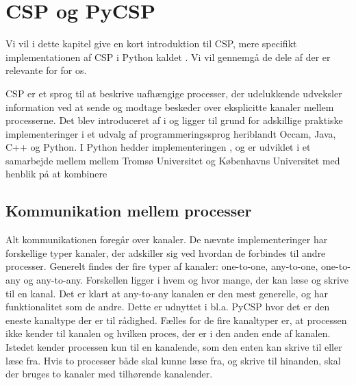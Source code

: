 \chapter{CSP og PyCSP}\label{sec:csp}


Vi vil i dette kapitel give en kort introduktion til CSP, mere specifikt implementationen af CSP i Python kaldet \pycsp. Vi vil gennemgå de dele af \pycsp der er relevante for for os. 

CSP er et sprog til at beskrive uafhængige processer, der udelukkende udveksler information ved at sende og modtage beskeder over eksplicitte kanaler mellem processerne. Det blev introduceret af \citeauthor{hoare-csp} i \cite{hoare-csp} og ligger til grund for adskillige praktiske implementeringer i et udvalg af programmeringssprog heriblandt Occam, Java, C++ og Python\cite{May1983, jcsp, Brown2007, pycsp}. I Python hedder implementeringen \pycsp, og er udviklet i et samarbejde mellem mellem Tromsø Universitet og Københavns Universitet med henblik på at kombinere  

\section{Kommunikation mellem processer}
Alt kommunikationen foregår over kanaler. De nævnte implementeringer har forskellige typer kanaler, der adskiller sig ved  hvordan de forbindes til andre processer. Generelt findes der fire typer af kanaler: one-to-one, any-to-one, one-to-any og any-to-any. Forskellen ligger i hvem og hvor mange, der kan læse og skrive til en kanal. Det er klart at any-to-any kanalen er den mest generelle, og har funktionalitet som de andre. Dette er udnyttet i bl.a. PyCSP hvor det er den eneste kanaltype der er til rådighed. Fælles for de fire kanaltyper er, at processen ikke kender til kanalen og hvilken proces, der er i den anden ende af kanalen. Istedet kender processen kun til en  kanalende, som  den enten kan skrive til eller læse fra. Hvis to processer både skal kunne læse fra, og skrive til hinanden, skal der bruges to kanaler med tilhørende kanalender. 

